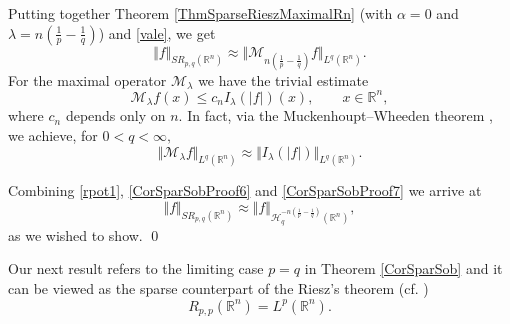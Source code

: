 \documentclass[11pt, a4paper,leqno]{amsart}
\theoremstyle{plain}
\newtheorem{corollary}{Corollary}
\numberwithin{equation}{section}
\theoremstyle{definition}
\theoremstyle{remark}
\newtheorem{remark}{Remark}
\begin{document}
Putting together Theorem \ref{ThmSparseRieszMaximalRn} (with $\alpha=0$ and
$\lambda= n (\frac{1}{p} -\frac{1}{q})$) and \eqref{vale}, we get%
\begin{equation}
\Vert f\Vert_{SR_{p,q}(\mathbb{R}^{n})}\approx\Vert\mathcal{M}_{n(\frac{1}%
{p}-\frac{1}{q})}f\Vert_{L^{q}(\mathbb{R}^{n})}. \label{CorSparSobProof6}%
\end{equation}
For the maximal operator $\mathcal{M}_{\lambda}$ we have the trivial estimate
\[
\mathcal{M}_{\lambda}f(x)\leq c_{n} I_{\lambda}(|f|)(x),\qquad x\in
\mathbb{R}^{n},
\]
where $c_{n}$ depends only on $n$. In fact, via the Muckenhoupt--Wheeden
theorem \cite[Theorem 1]{MW74}, we achieve, for $0<q<\infty,$
\begin{equation}
\Vert\mathcal{M}_{\lambda}f\Vert_{L^{q}(\mathbb{R}^{n})}\approx\Vert
I_{\lambda}(|f|)\Vert_{L^{q}(\mathbb{R}^{n})}. \label{CorSparSobProof7}%
\end{equation}


Combining \eqref{rpot1}, \eqref{CorSparSobProof6} and \eqref{CorSparSobProof7}
we arrive at
\[
\Vert f\Vert_{SR_{p,q}(\mathbb{R}^{n})}\approx\Vert f\Vert_{\mathcal{H}%
_{q}^{-n(\frac{1}{p}-\frac{1}{q})}(\mathbb{R}^{n})},
\]
as we wished to show. \qed
%
%
%



Our next result refers to the limiting case $p=q$ in Theorem \ref{CorSparSob}
and it can be viewed as the sparse counterpart of the Riesz's theorem (cf.
\cite[p. 1062]{DMComptes})%
\begin{equation}
R_{p,p}(\mathbb{R}^{n})=L^{p}(\mathbb{R}^{n}).\label{rieszclasico}%
\end{equation}
\end{document}
